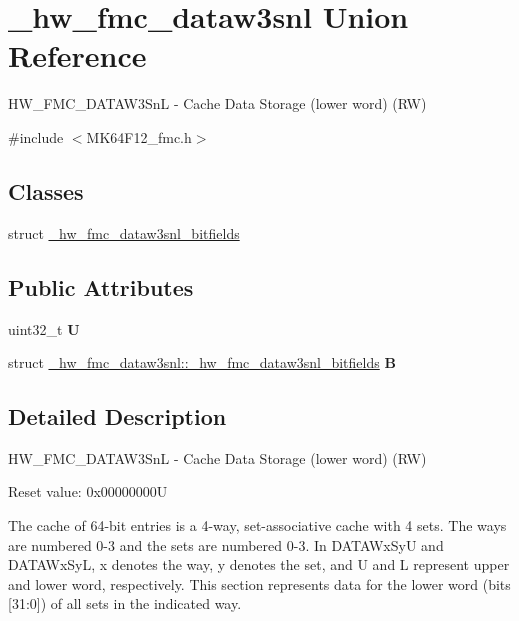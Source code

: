 \hypertarget{union__hw__fmc__dataw3snl}{}\section{\+\_\+hw\+\_\+fmc\+\_\+dataw3snl Union Reference}
\label{union__hw__fmc__dataw3snl}


H\+W\+\_\+\+F\+M\+C\+\_\+\+D\+A\+T\+A\+W3\+SnL -\/ Cache Data Storage (lower word) (RW)  




{\ttfamily \#include $<$M\+K64\+F12\+\_\+fmc.\+h$>$}

\subsection*{Classes}
\begin{DoxyCompactItemize}
\item 
struct \hyperlink{struct__hw__fmc__dataw3snl_1_1__hw__fmc__dataw3snl__bitfields}{\+\_\+hw\+\_\+fmc\+\_\+dataw3snl\+\_\+bitfields}
\end{DoxyCompactItemize}
\subsection*{Public Attributes}
\begin{DoxyCompactItemize}
\item 
uint32\+\_\+t {\bfseries U}\hypertarget{union__hw__fmc__dataw3snl_a1a032ba66637c3112a79a5b11bbec279}{}\label{union__hw__fmc__dataw3snl_a1a032ba66637c3112a79a5b11bbec279}

\item 
struct \hyperlink{struct__hw__fmc__dataw3snl_1_1__hw__fmc__dataw3snl__bitfields}{\+\_\+hw\+\_\+fmc\+\_\+dataw3snl\+::\+\_\+hw\+\_\+fmc\+\_\+dataw3snl\+\_\+bitfields} {\bfseries B}\hypertarget{union__hw__fmc__dataw3snl_a74493eedceed8bfb76fbf5359e1d5cf4}{}\label{union__hw__fmc__dataw3snl_a74493eedceed8bfb76fbf5359e1d5cf4}

\end{DoxyCompactItemize}


\subsection{Detailed Description}
H\+W\+\_\+\+F\+M\+C\+\_\+\+D\+A\+T\+A\+W3\+SnL -\/ Cache Data Storage (lower word) (RW) 

Reset value\+: 0x00000000U

The cache of 64-\/bit entries is a 4-\/way, set-\/associative cache with 4 sets. The ways are numbered 0-\/3 and the sets are numbered 0-\/3. In D\+A\+T\+A\+Wx\+SyU and D\+A\+T\+A\+Wx\+SyL, x denotes the way, y denotes the set, and U and L represent upper and lower word, respectively. This section represents data for the lower word (bits \mbox{[}31\+:0\mbox{]}) of all sets in the indicated way. 

